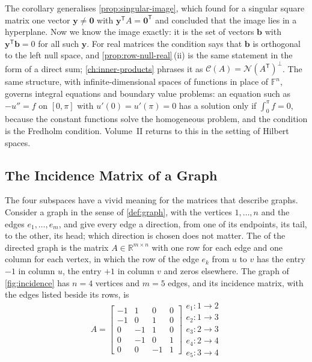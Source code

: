 The corollary generalises \cref{prop:singular-image}, which found for a singular square matrix one vector $\mathbf y\ne\mathbf 0$ with $\mathbf y^{\mathsf T}A=\mathbf 0^{\mathsf T}$ and concluded that the image lies in a hyperplane. Now we know the image exactly: it is the set of vectors $\mathbf b$ with $\mathbf y^{\mathsf T}\mathbf b=0$ for all such $\mathbf y$. For real matrices the condition says that $\mathbf b$ is orthogonal to the left null space, and \cref{prop:row-null-real}\,(ii) is the same statement in the form of a direct sum; \cref{ch:inner-products} phrases it as $\mathcal C(A)=\mathcal N(A^{\mathsf T})^\perp$. The same structure, with infinite-dimensional spaces of functions in place of $\mathbb F^n$, governs integral equations and boundary value problems: an equation such as $-u''=f$ on $[0,\pi]$ with $u'(0)=u'(\pi)=0$ has a solution only if $\int_0^\pi f=0$, because the constant functions solve the homogeneous problem, and the condition is the Fredholm condition. Volume~II returns to this in the setting of Hilbert spaces.

\subsection{The Incidence Matrix of a Graph}

The four subspaces have a vivid meaning for the matrices that describe graphs. Consider a graph in the sense of \cref{def:graph}, with the vertices $1,\ldots,n$ and the edges $e_1,\ldots,e_m$, and give every edge a direction, from one of its endpoints, its tail, to the other, its head; which direction is chosen does not matter. The  of the directed graph is the matrix $A\in\mathbb R^{m\times n}$ with one row for each edge and one column for each vertex, in which the row of the edge $e_k$ from $u$ to $v$ has the entry $-1$ in column $u$, the entry $+1$ in column $v$ and zeros elsewhere. The graph of \cref{fig:incidence} has $n=4$ vertices and $m=5$ edges, and its incidence matrix, with the edges listed beside its rows, is
\[
A=\begin{bmatrix}-1&1&0&0\\-1&0&1&0\\0&-1&1&0\\0&-1&0&1\\0&0&-1&1\end{bmatrix}
\begin{matrix}e_1\colon1\to2\\e_2\colon1\to3\\e_3\colon2\to3\\e_4\colon2\to4\\e_5\colon3\to4\end{matrix}
\]

